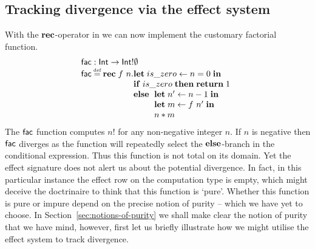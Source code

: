 \documentclass[12pt,phd,lfcs,twoside,openright,logo,leftchapter,normalheadings]{infthesis}
\theoremstyle{plain}
\theoremstyle{definition}
\begin{document}
\subsection{Tracking divergence via the effect system}
\label{sec:tracking-div}
%
With the $\mathbf{rec}$-operator in \BCalcRec{} we can now implement the
customary factorial function.
%
\[
  \bl
    \dec{fac} : \Int \to \Int \eff \emptyset\\
    \dec{fac} \defas \Rec\;f~n.
       \ba[t]{@{}l}
         \Let\;is\_zero \revto n = 0\;\In\\
         \If\;is\_zero\;\Then\; \Return\;1\\
         \Else\;\ba[t]{@{~}l}
                   \Let\; n' \revto n - 1 \;\In\\
                   \Let\; m \revto f~n' \;\In\\
                   n * m
                 \ea
       \ea
  \el
\]
%
The $\mathsf{fac}$ function computes $n!$ for any non-negative integer
$n$. If $n$ is negative then $\mathsf{fac}$ diverges as the function will
repeatedly select the $\mathbf{else}$-branch in the conditional
expression. Thus this function is not total on its domain. Yet the
effect signature does not alert us about the potential divergence. In
fact, in this particular instance the effect row on the computation
type is empty, which might deceive the doctrinaire to think that this
function is `pure'. Whether this function is pure or impure depend on
the precise notion of purity -- which we have yet to choose. In
Section~\ref{sec:notions-of-purity} we shall make clear the notion of
purity that we have mind, however, first let us briefly illustrate how
we might utilise the effect system to track divergence.
\end{document}
